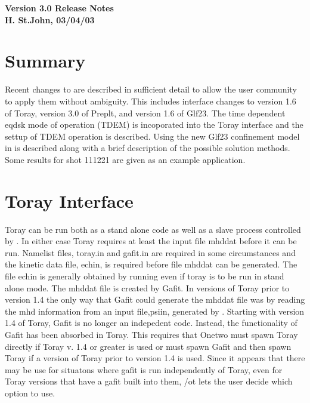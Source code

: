 \documentclass[12pt]{article}
\begin{document}
 
\begin{center} \bfseries
  \ot Version 3.0 Release Notes \\
  H. St.John, 03/04/03 \\
\end{center}
        \section*{Summary}
        \normalsize \mdseries
     Recent changes to \ot are described in sufficient detail to allow
     the user community to apply  them without ambiguity.
     This includes interface changes to version 1.6 of Toray,
     version 3.0 of Preplt, and version 1.6 of Glf23.
     The time  dependent eqdsk mode of operation (TDEM)  is incoporated
     into the Toray interface and the settup of TDEM operation is
     described. Using  the new Glf23 confinement model in
     \ot is described along with a brief description of the possible
     solution methods. Some results for shot 111221 are given as an
     example application.

  
   \section{Toray Interface} 
    Toray can be run both as a stand alone code as well as a 
    slave process controlled by \ot. In either  case Toray requires
    at least the input file mhddat before it can be run.
    Namelist files, toray.in and
    gafit.in  are 
    required in some circumstances  and the kinetic data file, echin,
    is required before file mhddat can be generated. The file echin is
    generally obtained by running \ot even if toray is to be run in
    stand alone mode. The mhddat file is created by Gafit. In versions
    of Toray  prior to version 1.4 the only way that
    Gafit could generate the mhddat file was by reading the mhd
    information from an input file,psiin, generated by \ot.
     Starting with version 1.4 of Toray, Gafit is no longer an indepedent code.
     Instead, the functionality of Gafit has been absorbed in Toray.
     This requires that Onetwo must spawn Toray directly if Toray
     v. 1.4 or greater is used or \ot must spawn Gafit and then spawn Toray if
     a version of Toray prior to version 1.4 is used. Since it appears
     that there may be use for situatons where gafit is run
     independently of Toray, even for Toray versions that have a gafit
     built into them, /ot lets the user decide which option to use.
\end{document}
